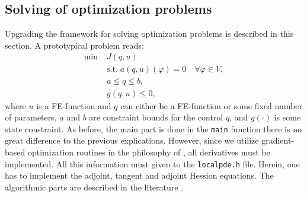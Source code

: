 \documentclass[prodmode,acmtoms]{acmsmall}
\numberwithin{equation}{section}
\renewcommand{\phi}{\varphi}
\begin{document}
\subsection{Solving of optimization problems}
Upgrading the framework for solving optimization problems
is described in this section. A prototypical problem reads:
\begin{align*}
\min\;&J(q,u) \\
  &\text{s.t.}\; a(q,u)(\phi) = 0 \quad \forall \phi\in V,\\
  &a \le q \le b,\\
  &g(q,u) \le 0,  
\end{align*}
where $u$ is a FE-function and $q$ can either be a FE-function or some 
fixed number of parameters, $a$ and $b$ are constraint bounds for the control $q$,
and $g(\cdot)$ is some state constraint.
As before, the main part is done in the \texttt{main} function there is no
great difference to the previous explications. However, 
since we utilize gradient-based optimization routines in the philosophy of
\cite{Troe99,HiKu01},
all derivatives must be implemented. All this information
must given to the \texttt{localpde.h} file. Herein, one has to 
implement the adjoint, tangent and adjoint Hession equations. 
The algorithmic parts are described in the literature \cite{BeMeVe06}.
\end{document}
